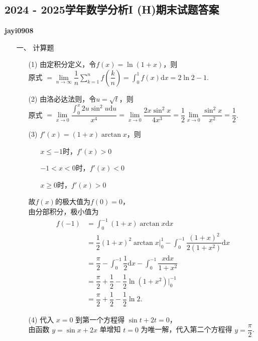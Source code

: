 \documentclass{ctexbook}
\begin{document}
\centering
\subsection*{2024 - 2025学年数学分析I (H)期末试题答案}
\centering
\textbf{jayi0908}

\begin{enumerate}
    \item[一、]计算题
    \begin{enumerate}
        \item[(1)] 由定积分定义，令\(f(x)=\ln(1+x)\)，则\\
        原式 \(=\lim\limits_{n\to\infty}\dfrac{1}{n}\displaystyle\sum\limits_{k=1}^{n}f(\dfrac{k}{n})=\int_{0}^{1}f(x) \mathrm{d}x=2\ln 2-1\).
        \item[(2)] 由洛必达法则，令\(u=\sqrt{t}\)，则\\
        原式 \(=\lim\limits_{x\to0}\dfrac{\int_{0}^{x}2u\sin^2u \mathrm{d}u}{x^{4}}=\lim\limits_{x\to0}\dfrac{2x\sin^2x}{4x^3}=\dfrac{1}{2}\lim\limits_{x\to0}\dfrac{\sin^2x}{x^2}=\dfrac{1}{2}\).
        \item[(3)] \(f'(x)=\left(1+x\right)\arctan x\)，则
        \begin{enumerate}
            \item[] \(x\leq -1\)时，\(f'(x)>0\)
            \item[] \(-1<x<0\)时，\(f'(x)<0\)
            \item[] \(x\geq 0\)时，\(f'(x)>0\)
        \end{enumerate}
        故\(f(x)\)的极大值为\(f(0)=0\)，\\
        由分部积分，极小值为
        \begin{align*}
            f(-1)&=\int_{0}^{-1}(1+x)\arctan x \mathrm{d}x\\
                & =\dfrac{1}{2}(1+x)^2\arctan x\vert_{0}^{1}-\int_{0}^{-1}\dfrac{(1+x)^2}{2(1+x^2)} \mathrm{d}x\\
                & =\dfrac{\pi}{2}-\int_{0}^{-1}\dfrac{1}{2} \mathrm{d}x -\int_{0}^{-1}\dfrac{x \mathrm{d}x}{1+x^2}\\
                & =\dfrac{\pi}{2}+\dfrac{1}{2}-\dfrac{1}{2}\ln(1+x^2)\vert_{0}^{-1}\\
                & =\dfrac{\pi}{2}+\dfrac{1}{2}-\dfrac{1}{2}\ln 2.
        \end{align*}
        \item[(4)] 代入 \(x=0\) 到第一个方程得 \(\sin t+2t=0\)，\\
        由函数 \(y=\sin x+2x\) 单增知 \(t=0\) 为唯一解，代入第二个方程得 \(y=\dfrac{\pi}{2}\).\\

\end{enumerate}
\end{enumerate}
\end{document}
